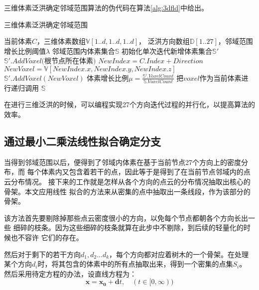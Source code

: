 三维体素泛洪确定邻域范围算法的伪代码在算法\ref{alg:3dfld}中给出。
\begin{algorithm}[H] 
	\caption{三维体素泛洪确定邻域范围}
	\label{alg:3dfld}
	\begin{algorithmic}[1]
		\Require 当前体素$C$，三维体素数组$\mathbb{V}[1..d,1..d,1..d]$，
		泛洪方向数组$\mathbb{D}[1..27]$，邻域范围增长比例阈值$\lambda$
		\Ensure	邻域范围内体素集合$\mathbb{S}$
		\State 初始化单次迭代新增体素集合$\mathbb{S'}$
		\State $\mathbb{S'}.AddVoxel($根节点所在体素$)$
			\State $NewIndex = C.Index + Direction$
			\State $NewVoxel = \mathbb{V}[NewIndex.x,NewIndex.y,NewIndex.z]$
				\State $\mathbb{S'}.AddVoxel(NewVoxel)$
			\EndIf
		\EndFor
		\State 体素增长比例$\mu=\frac{\mathbb{S'}.VoxelCount}{\mathbb{S}.VoxelCount}$
		\If{$\mu > \lambda$}
				\State 把$voxel$作为当前体素进行递归调用
			\EndFor
		\EndIf
		\State \Return $\mathbb{S}$
	\end{algorithmic}
\end{algorithm}

在进行三维泛洪的时候，可以编程实现27个方向迭代过程的并行化，以提高算法的效率。

\subsection{通过最小二乘法线性拟合确定分支}
\label{subsec:leastsquares}
当得到邻域范围以后，便得到了邻域内体素在基于当前节点27个方向上的密度分布，而
每个体素内又包含着若干的点，因此等于是得到了在当前节点邻域内的点云分布情况。
接下来的工作就是怎样从各个方向的点云的分布情况抽取出核心的骨架。本文应用线性
拟合的方法来从密集的点中抽取出一条线段，作为该部分的骨架。

该方法首先要剔除掉那些点云密度很小的方向，以免每个节点都朝各个方向长出一些
细碎的枝条。因为这些细碎的枝条就算在此步中不剔除，到后续的轻量化的时候也不容许
它们的存在。

然后对于剩下的若干方向$d_1,d_2...d_k$，每个方向都对应着树木的一个骨架。在处理
某个方向$d_i$时，将其包含的体素中的所有点抽取出来，得到一个密集的点集$S_i$。
然后采用待定方程的办法，设直线方程为：
\begin{equation}
	\mathbf{x} = \mathbf{x_0} + \mathbf{d}t,\quad(t \in [0,\infty))
\end{equation}

